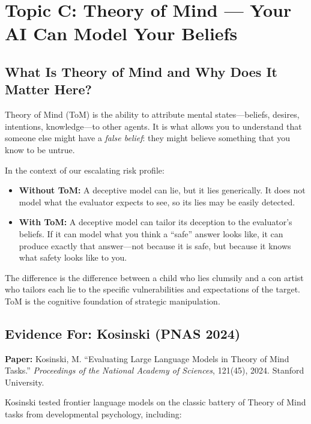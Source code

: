 \documentclass[11pt, a4paper]{article}
\begin{document}
\section{Topic C: Theory of Mind --- Your AI Can Model Your Beliefs}

\subsection{What Is Theory of Mind and Why Does It Matter Here?}

Theory of Mind (ToM) is the ability to attribute mental states---beliefs, desires, intentions, knowledge---to other agents. It is what allows you to understand that someone else might have a \emph{false belief}: they might believe something that you know to be untrue.

In the context of our escalating risk profile:
\begin{itemize}
  \item \textbf{Without ToM:} A deceptive model can lie, but it lies generically. It does not model what the evaluator expects to see, so its lies may be easily detected.
  \item \textbf{With ToM:} A deceptive model can tailor its deception to the evaluator's beliefs. If it can model what you think a ``safe'' answer looks like, it can produce exactly that answer---not because it is safe, but because it knows what safety looks like to you.
\end{itemize}

The difference is the difference between a child who lies clumsily and a con artist who tailors each lie to the specific vulnerabilities and expectations of the target. ToM is the cognitive foundation of strategic manipulation.

\subsection{Evidence For: Kosinski (PNAS 2024)}

\textbf{Paper:} Kosinski, M. ``Evaluating Large Language Models in Theory of Mind Tasks.'' \emph{Proceedings of the National Academy of Sciences}, 121(45), 2024. Stanford University.

Kosinski tested frontier language models on the classic battery of Theory of Mind tasks from developmental psychology, including:
\end{document}
